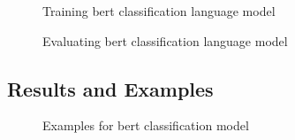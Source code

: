 \documentclass[12pt, a4paper]{article}
\begin{document}
\begin{figure}[H]
	\caption{Training bert classification language model}
	\label{classification-lm_train}
\end{figure}

\begin{figure}[H]
	\caption{Evaluating bert classification language model}
	\label{classification-lm_eval}
\end{figure}

\subsection*{Results and Examples}
\begin{figure}[H]
	\caption{Examples for bert classification model}
	\label{classification-lm_examples}
\end{figure}
\end{document}
